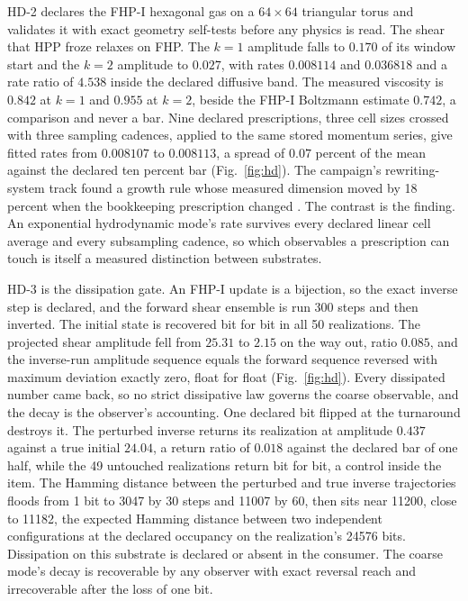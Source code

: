 \documentclass[aps,pre,reprint,nofootinbib,floatfix]{revtex4-2}
\begin{document}
HD-2 declares the FHP-I hexagonal gas on a $64\times64$ triangular
torus and validates it with exact geometry self-tests before any
physics is read.  The shear that HPP froze relaxes on FHP.  The
$k=1$ amplitude falls to $0.170$ of its window start and the $k=2$
amplitude to $0.027$, with rates $0.008114$ and $0.036818$ and a
rate ratio of $4.538$ inside the declared diffusive band.  The
measured viscosity is $0.842$ at $k=1$ and $0.955$ at $k=2$, beside
the FHP-I Boltzmann estimate $0.742$, a comparison and never a bar.
Nine
declared prescriptions, three cell sizes crossed with three
sampling cadences, applied to the same stored momentum series,
give fitted rates from $0.008107$ to $0.008113$, a spread of
$0.07$ percent of the mean against the declared ten percent bar
(Fig.~\ref{fig:hd}).  The campaign's rewriting-system track found a
growth rule whose measured dimension moved by 18 percent when the
bookkeeping prescription changed \cite{WMPaper}.  The contrast is
the finding.  An exponential hydrodynamic mode's rate survives
every declared linear cell average and every subsampling cadence,
so which observables a prescription can touch is itself a measured
distinction between substrates.

HD-3 is the dissipation gate.  An FHP-I update is a bijection, so
the exact inverse step is declared, and the forward shear ensemble
is run 300 steps and then inverted.  The initial state is recovered
bit for bit in all 50 realizations.  The projected shear amplitude
fell from $25.31$ to $2.15$ on the way out, ratio $0.085$, and the
inverse-run amplitude sequence equals the forward sequence reversed
with maximum deviation exactly zero, float for float
(Fig.~\ref{fig:hd}).  Every dissipated number came back, so no
strict dissipative law governs the coarse observable, and the decay
is the observer's accounting.  One declared bit flipped at the
turnaround destroys it.  The perturbed inverse returns its
realization at amplitude $0.437$ against a true initial $24.04$, a
return ratio of $0.018$ against the declared bar of one half, while
the 49 untouched realizations return bit for bit, a control inside
the item.  The Hamming distance between the perturbed and true
inverse trajectories floods from 1 bit to 3047 by 30 steps and
11007 by 60, then sits near 11200, close to 11182, the expected
Hamming distance between two independent configurations at the
declared occupancy on the realization's 24576 bits.  Dissipation on this substrate is declared or absent
in the consumer.  The coarse mode's decay is recoverable by any
observer with exact reversal reach and irrecoverable after the
loss of one bit.
\end{document}
